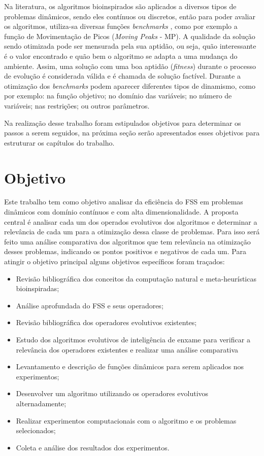 Na literatura, os algoritmos bioinspirados são aplicados a diversos tipos de problemas dinâmicos, sendo eles contínuos ou discretos, então para poder avaliar os algoritmos, utiliza-sa diversas funções \textit{benchmarks} \cite{moser2007review}, como por exemplo a função de Movimentação de Picos (\textit{Moving Peaks} - MP). A qualidade da solução sendo otimizada pode ser mensurada pela sua aptidão, ou seja, quão interessante é o valor encontrado e quão bem o algoritmo se adapta a uma mudança do ambiente. Assim, uma solução com uma boa aptidão (\textit{fitness}) durante o processo de evolução é considerada válida e é chamada de solução factível. Durante a otimização dos \textit{benchmarks} podem aparecer diferentes tipos de dinamismo, como por exemplo: na função objetivo; no domínio das variáveis; no número de variáveis; nas restrições; ou outros parâmetros.

Na realização desse trabalho foram estipulados objetivos para determinar os passos a serem seguidos, na próxima seção serão apresentados esses objetivos para estruturar os capítulos do trabalho.	

\section{Objetivo}
\label{sec:objetivo}
Este trabalho tem como objetivo analisar da eficiência do FSS em problemas dinâmicos com domínio contínuos e com alta dimensionalidade. A proposta central é analisar cada um dos operados evolutivos dos algoritmos e determinar a relevância de cada um para a otimização dessa classe de problemas. Para isso será feito uma análise comparativa dos algoritmos que tem relevância na otimização desses problemas, indicando os pontos positivos e negativos de cada um. Para atingir o objetivo principal alguns objetivos específicos foram traçados:

\begin{itemize}
\item Revisão bibliográfica dos conceitos da computação natural e meta-heurísticas bioinspiradas;
\item Análise aprofundada do FSS e seus operadores;
\item Revisão bibliográfica dos operadores evolutivos existentes;
\item Estudo dos algoritmos evolutivos de inteligência de enxame para verificar a relevância dos operadores existentes e realizar uma análise comparativa
\item Levantamento e descrição de funções dinâmicos para serem aplicados nos experimentos;
\item Desenvolver um algoritmo utilizando os operadores evolutivos alternadamente;
\item Realizar experimentos computacionais com o algoritmo e os problemas selecionados;
\item Coleta e análise dos resultados dos experimentos.
\end{itemize} 

